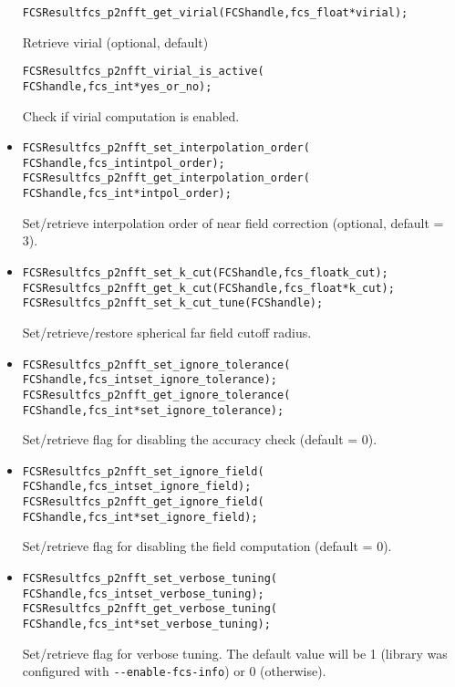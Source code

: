 \begin{itemize}
\begin{alltt}
FCSResult fcs_p2nfft_get_virial(FCS handle, fcs_float* virial);
\end{alltt}
    Retrieve virial (optional, default)
\begin{alltt}
FCSResult fcs_p2nfft_virial_is_active(
    FCS handle, fcs_int* yes_or_no);
\end{alltt}
    Check if virial computation is enabled.
  \item
\begin{alltt}
FCSResult fcs_p2nfft_set_interpolation_order(
    FCS handle, fcs_int intpol_order);
FCSResult fcs_p2nfft_get_interpolation_order(
    FCS handle, fcs_int* intpol_order);
\end{alltt}
    Set/retrieve interpolation order of near field correction (optional, default = 3).
  \item
\begin{alltt}
FCSResult fcs_p2nfft_set_k_cut(FCS handle, fcs_float k_cut);
FCSResult fcs_p2nfft_get_k_cut(FCS handle, fcs_float* k_cut);
FCSResult fcs_p2nfft_set_k_cut_tune(FCS handle);
\end{alltt}
    Set/retrieve/restore spherical far field cutoff radius.
  \item
\begin{alltt}
FCSResult fcs_p2nfft_set_ignore_tolerance(
    FCS handle, fcs_int set_ignore_tolerance);
FCSResult fcs_p2nfft_get_ignore_tolerance(
    FCS handle, fcs_int* set_ignore_tolerance);
\end{alltt}
    Set/retrieve flag for disabling the accuracy check (default = 0).
  \item
\begin{alltt}
FCSResult fcs_p2nfft_set_ignore_field(
    FCS handle, fcs_int set_ignore_field);
FCSResult fcs_p2nfft_get_ignore_field(
    FCS handle, fcs_int* set_ignore_field);
\end{alltt}
    Set/retrieve flag for disabling the field computation (default = 0).
  \item
\begin{alltt}
FCSResult fcs_p2nfft_set_verbose_tuning(
    FCS handle, fcs_int set_verbose_tuning);
FCSResult fcs_p2nfft_get_verbose_tuning(
    FCS handle, fcs_int* set_verbose_tuning);
\end{alltt}
    Set/retrieve flag for verbose tuning. The default value will be 1 (library was configured with \verb!--enable-fcs-info!) or 0 (otherwise).
\end{itemize}


